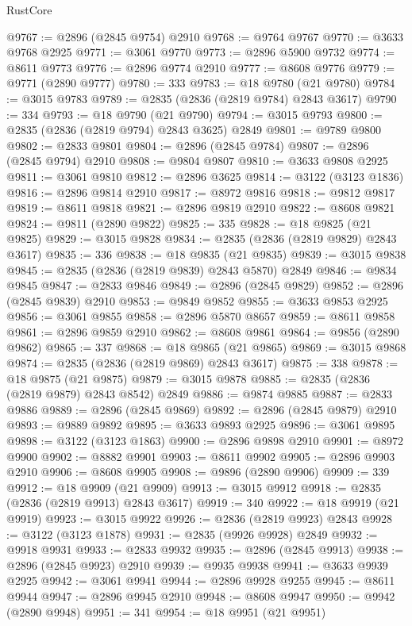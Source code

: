 \begin{lexlean}{RustCore}
\begin{coremodule}
@9767 := @2896 (@2845 @9754) @2910
@9768 := @9764 @9767
@9770 := @3633 @9768 @2925
@9771 := @3061 @9770
@9773 := @2896 @5900 @9732
@9774 := @8611 @9773
@9776 := @2896 @9774 @2910
@9777 := @8608 @9776
@9779 := @9771 (@2890 @9777)
@9780 := 333
@9783 := @18 @9780 (@21 @9780)
@9784 := @3015 @9783
@9789 := @2835 (@2836 (@2819 @9784) @2843 @3617)
@9790 := 334
@9793 := @18 @9790 (@21 @9790)
@9794 := @3015 @9793
@9800 := @2835 (@2836 (@2819 @9794) @2843 @3625) @2849
@9801 := @9789 @9800
@9802 := @2833 @9801
@9804 := @2896 (@2845 @9784)
@9807 := @2896 (@2845 @9794) @2910
@9808 := @9804 @9807
@9810 := @3633 @9808 @2925
@9811 := @3061 @9810
@9812 := @2896 @3625
@9814 := @3122 (@3123 @1836)
@9816 := @2896 @9814 @2910
@9817 := @8972 @9816
@9818 := @9812 @9817
@9819 := @8611 @9818
@9821 := @2896 @9819 @2910
@9822 := @8608 @9821
@9824 := @9811 (@2890 @9822)
@9825 := 335
@9828 := @18 @9825 (@21 @9825)
@9829 := @3015 @9828
@9834 := @2835 (@2836 (@2819 @9829) @2843 @3617)
@9835 := 336
@9838 := @18 @9835 (@21 @9835)
@9839 := @3015 @9838
@9845 := @2835 (@2836 (@2819 @9839) @2843 @5870) @2849
@9846 := @9834 @9845
@9847 := @2833 @9846
@9849 := @2896 (@2845 @9829)
@9852 := @2896 (@2845 @9839) @2910
@9853 := @9849 @9852
@9855 := @3633 @9853 @2925
@9856 := @3061 @9855
@9858 := @2896 @5870 @8657
@9859 := @8611 @9858
@9861 := @2896 @9859 @2910
@9862 := @8608 @9861
@9864 := @9856 (@2890 @9862)
@9865 := 337
@9868 := @18 @9865 (@21 @9865)
@9869 := @3015 @9868
@9874 := @2835 (@2836 (@2819 @9869) @2843 @3617)
@9875 := 338
@9878 := @18 @9875 (@21 @9875)
@9879 := @3015 @9878
@9885 := @2835 (@2836 (@2819 @9879) @2843 @8542) @2849
@9886 := @9874 @9885
@9887 := @2833 @9886
@9889 := @2896 (@2845 @9869)
@9892 := @2896 (@2845 @9879) @2910
@9893 := @9889 @9892
@9895 := @3633 @9893 @2925
@9896 := @3061 @9895
@9898 := @3122 (@3123 @1863)
@9900 := @2896 @9898 @2910
@9901 := @8972 @9900
@9902 := @8882 @9901
@9903 := @8611 @9902
@9905 := @2896 @9903 @2910
@9906 := @8608 @9905
@9908 := @9896 (@2890 @9906)
@9909 := 339
@9912 := @18 @9909 (@21 @9909)
@9913 := @3015 @9912
@9918 := @2835 (@2836 (@2819 @9913) @2843 @3617)
@9919 := 340
@9922 := @18 @9919 (@21 @9919)
@9923 := @3015 @9922
@9926 := @2836 (@2819 @9923) @2843
@9928 := @3122 (@3123 @1878)
@9931 := @2835 (@9926 @9928) @2849
@9932 := @9918 @9931
@9933 := @2833 @9932
@9935 := @2896 (@2845 @9913)
@9938 := @2896 (@2845 @9923) @2910
@9939 := @9935 @9938
@9941 := @3633 @9939 @2925
@9942 := @3061 @9941
@9944 := @2896 @9928 @9255
@9945 := @8611 @9944
@9947 := @2896 @9945 @2910
@9948 := @8608 @9947
@9950 := @9942 (@2890 @9948)
@9951 := 341
@9954 := @18 @9951 (@21 @9951)

\end{coremodule}
\end{lexlean}
